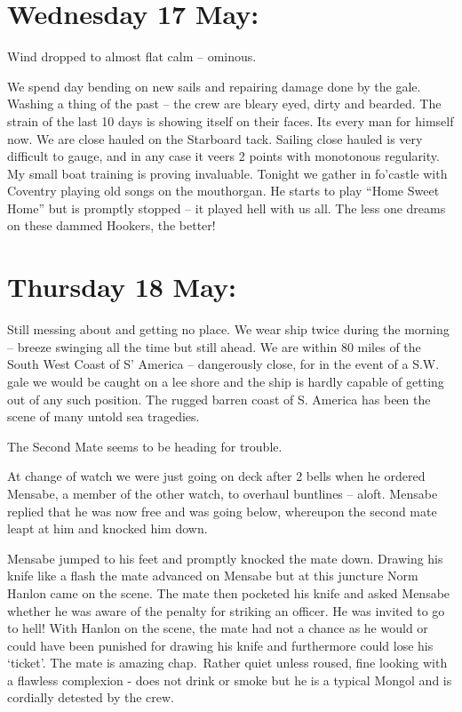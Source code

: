 \documentclass[
  11pt,
  msmallroyalvopaper
]{memoir}
\begin{document}
\hypertarget{wednesday-17-may}{%
\section{Wednesday 17 May:}\label{wednesday-17-may}}

Wind dropped to almost flat calm -- ominous.

We spend day bending on new sails and repairing damage done by the gale.
Washing a thing of the past -- the crew are bleary eyed, dirty and
bearded. The strain of the last 10 days is showing itself on their
faces. Its every man for himself now. We are close hauled on the
Starboard tack. Sailing close hauled is very difficult to gauge, and in
any case it veers 2 points with monotonous regularity. My small boat
training is proving invaluable. Tonight we gather in fo'castle with
Coventry playing old songs on the mouthorgan. He starts to play ``Home
Sweet Home'' but is promptly stopped -- it played hell with us all. The
less one dreams on these dammed Hookers, the better!

\hypertarget{thursday-18-may}{%
\section{Thursday 18 May:}\label{thursday-18-may}}

Still messing about and getting no place. We wear ship twice during the
morning -- breeze swinging all the time but still ahead. We are within
80 miles of the South West Coast of S' America -- dangerously close, for
in the event of a S.W. gale we would be caught on a lee shore and the
ship is hardly capable of getting out of any such position. The rugged
barren coast of S. America has been the scene of many untold sea
tragedies.

The Second Mate seems to be heading for trouble.

At change of watch we were just going on deck after 2 bells when he
ordered Mensabe, a member of the other watch, to overhaul buntlines --
aloft. Mensabe replied that he was now free and was going below,
whereupon the second mate leapt at him and knocked him down.

Mensabe jumped to his feet and promptly knocked the mate down. Drawing
his knife like a flash the mate advanced on Mensabe but at this juncture
Norm Hanlon came on the scene. The mate then pocketed his knife and
asked Mensabe whether he was aware of the penalty for striking an
officer. He was invited to go to hell! With Hanlon on the scene, the
mate had not a chance as he would or could have been punished for
drawing his knife and furthermore could lose his `ticket'. The mate is
amazing chap.~Rather quiet unless roused, fine looking with a flawless
complexion - does not drink or smoke but he is a typical Mongol and is
cordially detested by the crew.
\end{document}

